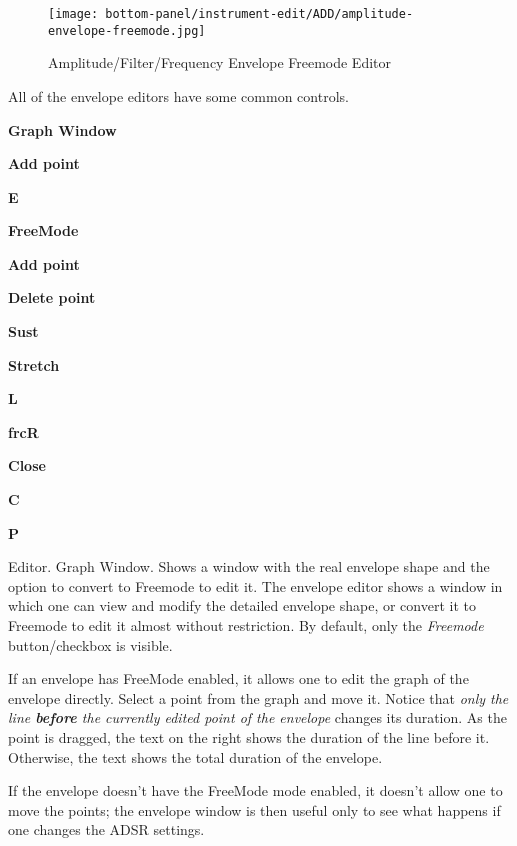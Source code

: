 \begin{figure}[H]
   \centering 
   \texttt{[image: bottom-panel/instrument-edit/ADD/amplitude-envelope-freemode.jpg]}
   \caption{Amplitude/Filter/Frequency Envelope Freemode Editor}
   \label{fig:amplitude_envelope_freemode}
\end{figure}

   All of the envelope editors have some common controls.

   \begin{enumber}
      \item \textbf{Graph Window}
      \item \textbf{Add point}
      \item \textbf{E}
      \item \textbf{FreeMode}
      \item \textbf{Add point}
      \item \textbf{Delete point}
      \item \textbf{Sust}
      \item \textbf{Stretch}
      \item \textbf{L}
      \item \textbf{frcR}
      \item \textbf{Close}
      \item \textbf{C}
      \item \textbf{P}
   \end{enumber}

   \setcounter{ItemCounter}{0}      %

   Editor.  Graph Window.
   Shows a window with the real envelope shape and the option to convert to
   Freemode to edit it.
   The envelope editor shows a window in which one can view and modify the
   detailed envelope shape, or convert it to Freemode to edit it almost
   without restriction.
   By default, only the \textsl{Freemode} button/checkbox is visible.

   If an envelope has FreeMode enabled, it allows one to edit the
   graph of the envelope directly. Select a point from the graph and move it.
   Notice that
   \textsl{only the line \textbf{before} the currently edited point of the
   envelope} changes its duration.
   As the point is dragged, the text on the right shows the duration of
   the line before it. Otherwise, the text shows the total duration of the
   envelope. 

   If the envelope doesn't have the FreeMode mode enabled, it doesn't allow
   one to move the points; the envelope window is then useful only to see
   what happens if one changes the ADSR settings.

